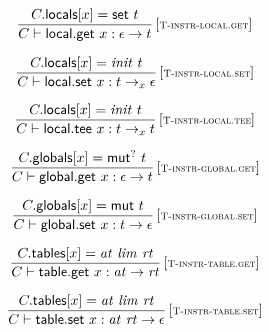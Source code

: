 \vspace{1ex}

$$
\begin{array}{@{}c@{}}\displaystyle
\frac{
C{.}\mathsf{locals}{}[x] = \mathsf{set}~t
}{
C \vdash \mathsf{local{.}get}~x : \epsilon \rightarrow t
} \, {[\textsc{\scriptsize T{-}instr{-}local.get}]}
\qquad
\end{array}
$$

$$
\begin{array}{@{}c@{}}\displaystyle
\frac{
C{.}\mathsf{locals}{}[x] = {\mathit{init}}~t
}{
C \vdash \mathsf{local{.}set}~x : t \rightarrow_{x} \epsilon
} \, {[\textsc{\scriptsize T{-}instr{-}local.set}]}
\qquad
\end{array}
$$

$$
\begin{array}{@{}c@{}}\displaystyle
\frac{
C{.}\mathsf{locals}{}[x] = {\mathit{init}}~t
}{
C \vdash \mathsf{local{.}tee}~x : t \rightarrow_{x} t
} \, {[\textsc{\scriptsize T{-}instr{-}local.tee}]}
\qquad
\end{array}
$$

\vspace{1ex}

$$
\begin{array}{@{}c@{}}\displaystyle
\frac{
C{.}\mathsf{globals}{}[x] = {\mathsf{mut}^?}~t
}{
C \vdash \mathsf{global{.}get}~x : \epsilon \rightarrow t
} \, {[\textsc{\scriptsize T{-}instr{-}global.get}]}
\qquad
\end{array}
$$

$$
\begin{array}{@{}c@{}}\displaystyle
\frac{
C{.}\mathsf{globals}{}[x] = \mathsf{mut}~t
}{
C \vdash \mathsf{global{.}set}~x : t \rightarrow \epsilon
} \, {[\textsc{\scriptsize T{-}instr{-}global.set}]}
\qquad
\end{array}
$$

\vspace{1ex}

$$
\begin{array}{@{}c@{}}\displaystyle
\frac{
C{.}\mathsf{tables}{}[x] = {\mathit{at}}~{\mathit{lim}}~{\mathit{rt}}
}{
C \vdash \mathsf{table{.}get}~x : {\mathit{at}} \rightarrow {\mathit{rt}}
} \, {[\textsc{\scriptsize T{-}instr{-}table.get}]}
\qquad
\end{array}
$$

$$
\begin{array}{@{}c@{}}\displaystyle
\frac{
C{.}\mathsf{tables}{}[x] = {\mathit{at}}~{\mathit{lim}}~{\mathit{rt}}
}{
C \vdash \mathsf{table{.}set}~x : {\mathit{at}}~{\mathit{rt}} \rightarrow \epsilon
} \, {[\textsc{\scriptsize T{-}instr{-}table.set}]}
\qquad
\end{array}
$$

